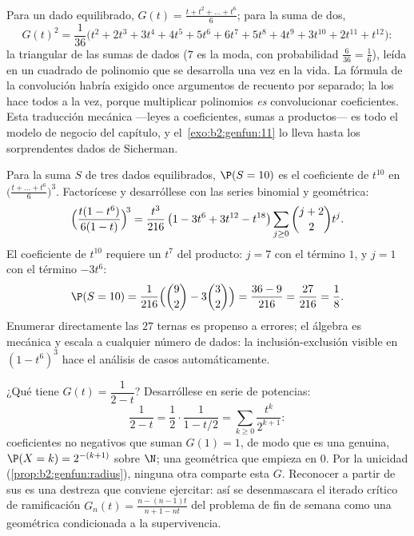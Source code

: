 \begin{example}\label{ex:b2:genfun:twodice}
Para un dado equilibrado, $G(t) = \frac{t + t^2 + \dots + t^6}{6}$;
para la suma de dos,
\[
G(t)^2 = \frac{1}{36}\bigl(t^2 + 2t^3 + 3t^4 + 4t^5 + 5t^6 +
6t^7 + 5t^8 + 4t^9 + 3t^{10} + 2t^{11} + t^{12}\bigr) :
\]
la  triangular de las sumas de dados ($7$ es la moda, con
probabilidad $\frac6{36} = \frac16$), leída en un cuadrado de
polinomio que se desarrolla una vez en la vida. La fórmula de la
convolución habría exigido once argumentos de recuento por separado;
la  los hace todos a la vez, porque multiplicar
polinomios \emph{es} convolucionar coeficientes. Esta traducción
mecánica ---leyes a coeficientes, sumas a productos--- es todo el
modelo de negocio del capítulo, y el~\cref{exo:b2:genfun:11} lo lleva
hasta los sorprendentes dados de Sicherman.
\end{example}

\begin{example}\label{ex:b2:genfun:threedice}
Para la suma $S$ de tres dados equilibrados, $\P(S = 10)$ es el
coeficiente de $t^{10}$ en $\bigl(\frac{t + \dots + t^6}6\bigr)^3$.
Factorícese y desarróllese con las series binomial y geométrica:
\[
\Bigl(\frac{t(1 - t^6)}{6(1 - t)}\Bigr)^{\!3}
= \frac{t^3}{216}\,\bigl(1 - 3t^6 + 3t^{12} -
t^{18}\bigr)\sum_{j\geq0}\binom{j+2}2t^j .
\]
El coeficiente de $t^{10}$ requiere un $t^7$ del producto: $j = 7$
con el término $1$, y $j = 1$ con el término $-3t^6$:
\[
\P(S = 10) = \frac{1}{216}\Bigl(\binom92 -
3\binom32\Bigr) = \frac{36 - 9}{216} = \frac{27}{216} =
\frac18 .
\]
Enumerar directamente las $27$ ternas es propenso a errores; el
álgebra es mecánica y escala a cualquier número de dados: la
inclusión-exclusión visible en $(1 - t^6)^3$ hace el análisis de
casos automáticamente.
\end{example}

\begin{example}\label{ex:b2:genfun:identify}
¿Qué  tiene $G(t) = \dfrac1{2 - t}$? Desarróllese en serie de
potencias:
\[
\frac{1}{2 - t} = \frac12\cdot\frac1{1 - t/2}
= \sum_{k\geq0}\frac{t^k}{2^{k+1}} :
\]
coeficientes no negativos que suman $G(1) = 1$, de modo que es una
 genuina, $\P(X = k) = 2^{-(k+1)}$ sobre $\N$; una 
geométrica que empieza en $0$. Por la unicidad
(\cref{prop:b2:genfun:radius}), ninguna otra  comparte esta $G$.
Reconocer  a partir de sus  es una
destreza que conviene ejercitar: así se desenmascara el iterado
crítico de ramificación $G_n(t) = \frac{n - (n-1)t}{n+1 - nt}$ del
problema de fin de semana como una  geométrica condicionada a la
supervivencia.
\end{example}

